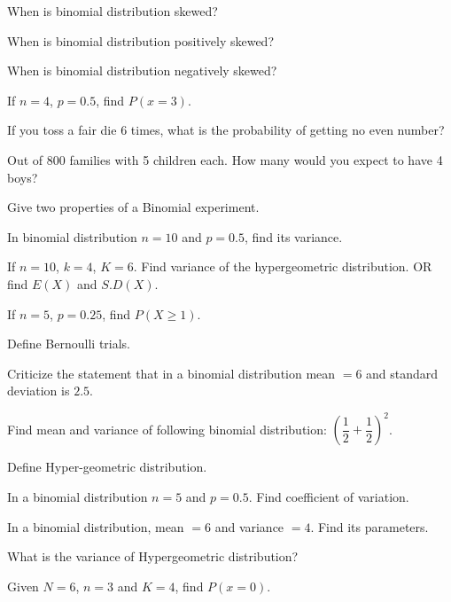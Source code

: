 \documentclass[11pt,a4paper]{article}
\begin{document}
\begin{shortlist}
\item When is binomial distribution skewed?

\item When is binomial distribution positively skewed?

\item When is binomial distribution negatively skewed?

\item If $n=4$, $p=0.5$, find $P(x=3)$.

\item If you toss a fair die 6 times, what is the probability of getting no even number?

\item Out of 800 families with 5 children each. How many would you expect to have 4 boys?

\item Give two properties of a Binomial experiment.

\item In binomial distribution $n=10$ and $p=0.5$, find its variance.

\item If $n=10$, $k=4$, $K=6$. Find variance of the hypergeometric distribution. OR find $E(X)$ and $S.D(X)$.

\item If $n=5$, $p=0.25$, find $P(X\ge1)$.

\item Define Bernoulli trials.

\item Criticize the statement that in a binomial distribution mean $=6$ and standard deviation is $2.5$.

\item Find mean and variance of following binomial distribution: $\left(\dfrac{1}{2}+\dfrac{1}{2}\right)^{2}$.

\item Define Hyper-geometric distribution.

\item In a binomial distribution $n=5$ and $p=0.5$. Find coefficient of variation.

\item In a binomial distribution, mean $=6$ and variance $=4$. Find its parameters.

\item What is the variance of Hypergeometric distribution?

\item Given $N=6$, $n=3$ and $K=4$, find $P(x=0)$.


\end{shortlist}
\end{document}
